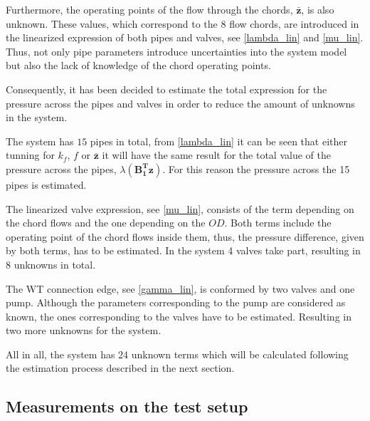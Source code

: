 %


Furthermore, the operating points of the flow through the chords, $\pmb{\bar{z}}$, is also unknown. These values, which correspond to the $8$ flow chords, are introduced in the linearized expression of both pipes 
and valves, see \eqref{lambda_lin} and \eqref{mu_lin}. Thus, not only pipe parameters introduce uncertainties into the system model but also the lack of knowledge of the chord operating points.

Consequently, it has been decided to estimate the total expression for the pressure across the pipes and valves in order to reduce the amount of unknowns in the system.

The system has $15$ pipes in total,  from \eqref{lambda_lin} it can be seen that either tunning for $k_f$, $f$ or $\pmb{\bar{z}}$ it will have the same result for the total
value of the pressure across the pipes, $\lambda(\pmb{{B_1^{T}}}\pmb{z})$. For this reason the pressure across the 15 pipes is estimated.

The linearized valve expression, see \eqref{mu_lin}, consists of the term depending on the chord flows and the one depending on the $OD$. Both terms include the operating 
point of the chord flows inside them, thus, the pressure difference, given by both terms, has to be estimated. In the system 4 valves take part, 
resulting in 8 unknowns in total. 

The WT connection edge, see \eqref{gamma_lin}, is conformed by two valves and one pump. Although the parameters corresponding to the pump are considered as known, the ones 
corresponding to the valves have to be estimated. Resulting in two more unknowns for the system. 

All in all, the system has $24$ unknown terms which will be calculated following the estimation process described in the next section.
\subsection{Measurements on the test setup}
\label{LinParamEst_measurements}

